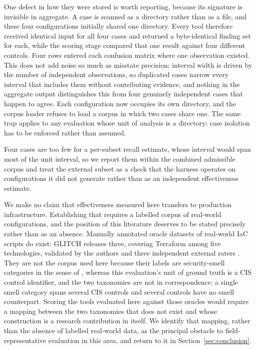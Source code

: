\documentclass[smallextended]{svjour3}
\begin{document}
One defect in how they were stored is worth reporting, because its signature is
invisible in aggregate. A case is scanned as a directory rather than as a file,
and these four configurations initially shared one directory. Every tool
therefore received identical input for all four cases and returned a
byte-identical finding set for each, while the scoring stage compared that one
result against four different controls. Four rows entered each confusion matrix
where one observation existed. This does not add noise so much as misstate
precision: interval width is driven by the number of independent observations, so
duplicated cases narrow every interval that includes them without contributing
evidence, and nothing in the aggregate output distinguishes this from four
genuinely independent cases that happen to agree. Each configuration now occupies
its own directory, and the corpus loader refuses to load a corpus in which two
cases share one. The same trap applies to any evaluation whose unit of analysis is
a directory: case isolation has to be enforced rather than assumed.

Four cases are too few for a per-subset recall estimate, whose interval would
span most of the unit interval, so we report them within the combined admissible
corpus and treat the external subset as a check that the harness operates on
configurations it did not generate rather than as an independent effectiveness
estimate.

We make no claim that effectiveness measured here transfers to production
infrastructure. Establishing that requires a labelled corpus of real-world
configurations, and the position of this literature deserves to be stated
precisely rather than as an absence. Manually annotated oracle datasets of
real-world IaC scripts do exist: GLITCH releases three, covering Terraform among
five technologies, validated by the authors and three independent external
raters \citep{saavedra2022glitch}. They are not the corpus used here because
their labels are security-smell categories in the sense of
\citet{rahman2019sins}, whereas this evaluation's unit of ground truth is a CIS
control identifier, and the two taxonomies are not in correspondence: a single
smell category spans several CIS controls and several controls have no smell
counterpart. Scoring the tools evaluated here against those oracles would require
a mapping between the two taxonomies that does not exist and whose construction
is a research contribution in itself. We identify that mapping, rather than the
absence of labelled real-world data, as the principal obstacle to
field-representative evaluation in this area, and return to it in
Section~\ref{sec:conclusion}.
\end{document}
